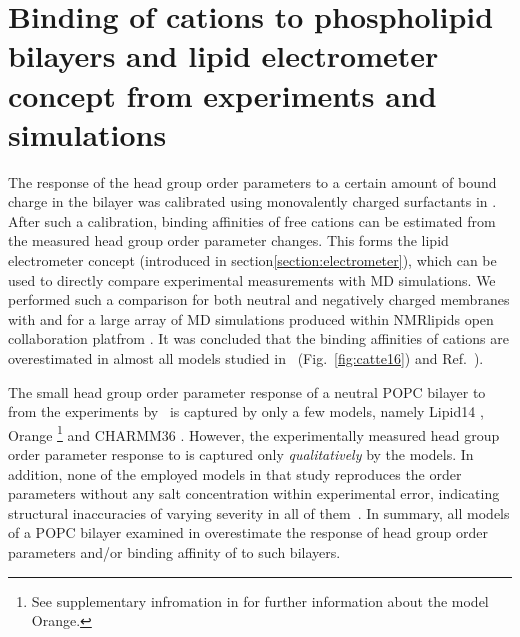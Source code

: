 \section{Binding of cations to phospholipid bilayers and lipid electrometer concept from experiments and simulations}
\label{section:electrometer_exp_sim} 

The response of the head group order parameters 
to a certain amount of bound charge in the bilayer 
was calibrated using monovalently charged surfactants in \citep{scherer89, akutsu81, altenbach84}. 
After such a calibration,
binding affinities of free cations can be estimated from the measured head group order parameter changes. \citep{scherer89}
This forms the lipid electrometer concept (introduced in section\ref{section:electrometer}),
which can be used to directly compare experimental measurements with MD simulations. 
We performed such a comparison for both neutral and negatively charged membranes with  and  
for a large array of MD simulations produced within NMRlipids open collaboration platfrom \citep{nmrlipids}. 
It was concluded  that the binding affinities of cations are overestimated in almost all models studied in~\citep{catte16} (Fig.~\ref{fig:catte16}) and Ref.~\citep{nmrlipids_proj4}). 


The small head group order parameter response of a neutral POPC bilayer to  from the experiments by~\citet{seelig87} is captured by only a few models, 
namely Lipid14 \citep{dickson14}, 
Orange \footnote{See supplementary infromation in \citep{catte16} for further information about the model Orange.} 
and CHARMM36 \citep{klauda10}. 
However, the experimentally measured head group order parameter response to  is captured only \emph{qualitatively} by the models. \citep{catte16}
In addition, none of the employed models in that study reproduces the order parameters without any salt concentration
within experimental error, indicating structural inaccuracies of varying severity in all of them~\citep{botan15}.
In summary, all models of a POPC bilayer examined in \citep{catte16} 
overestimate the response of head group order parameters and/or binding affinity of  to such bilayers. 



